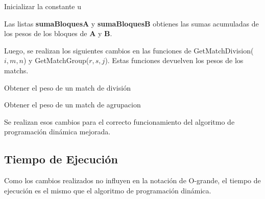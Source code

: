 \documentclass{article}
\begin{document}
\begin{algorithm}
\caption{Inicializar la constante u}
\begin{algorithmic}[1]
\end{algorithmic}
\end{algorithm}

Las listas \textbf{sumaBloquesA} y \textbf{sumaBloquesB} obtienes las sumas acumuladas de los pesos de los bloques de \textbf{A} y \textbf{B}.

Luego, se realizan los siguientes cambios en las funciones de GetMatchDivision($i, m, n$) y GetMatchGroup($r, s, j$). Estas funciones devuelven los pesos de los matchs.

\begin{algorithm}
\caption{Obtener el peso de un match de división}
\begin{algorithmic}[1]
    \EndIf
    \EndIf
\end{algorithmic}
\end{algorithm}

\begin{algorithm}
\caption{Obtener el peso de un match de agrupacion}
\begin{algorithmic}[1]
    \EndIf
    \EndIf
\end{algorithmic}
\end{algorithm}

Se realizan esos cambios para el correcto funcionamiento del algoritmo de programación dinámica mejorada.

\subsection{Tiempo de Ejecución}
Como los cambios realizados no influyen en la notación de O-grande, el tiempo de ejecución es el mismo que el algoritmo de programación dinámica.
\end{document}
